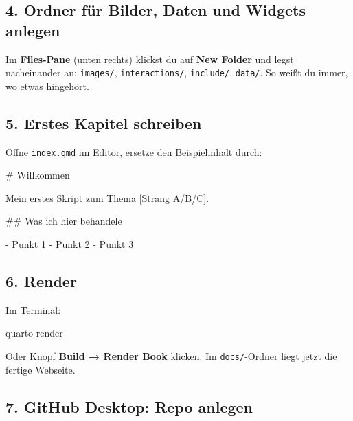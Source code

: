 \documentclass[
  ngerman,
  a4paper,
  DIV=11]{scrreprt}
\newenvironment{Shaded}{\begin{snugshade}}{\end{snugshade}}
\newcommand{\CommentTok}[1]{\textcolor[rgb]{0.37,0.37,0.37}{#1}}
\newcommand{\ExtensionTok}[1]{\textcolor[rgb]{0.00,0.23,0.31}{#1}}
\newcommand{\FunctionTok}[1]{\textcolor[rgb]{0.28,0.35,0.67}{#1}}
\newcommand{\NormalTok}[1]{\textcolor[rgb]{0.00,0.23,0.31}{#1}}
\newcommand{\OtherTok}[1]{\textcolor[rgb]{0.00,0.23,0.31}{#1}}
\newcommand{\SpecialStringTok}[1]{\textcolor[rgb]{0.13,0.47,0.30}{#1}}
\begin{document}
\subsection{4. Ordner für Bilder, Daten und Widgets
anlegen}\label{ordner-fuxfcr-bilder-daten-und-widgets-anlegen}

Im \textbf{Files-Pane} (unten rechts) klickst du auf \textbf{New Folder}
und legst nacheinander an: \texttt{images/}, \texttt{interactions/},
\texttt{include/}, \texttt{data/}. So weißt du immer, wo etwas
hingehört.

\subsection{5. Erstes Kapitel schreiben}\label{erstes-kapitel-schreiben}

Öffne \texttt{index.qmd} im Editor, ersetze den Beispielinhalt durch:

\begin{Shaded}
\begin{Highlighting}[]
\FunctionTok{\# Willkommen}

\NormalTok{Mein erstes Skript zum Thema }\CommentTok{[}\OtherTok{Strang A/B/C}\CommentTok{]}\NormalTok{.}

\FunctionTok{\#\# Was ich hier behandele}

\SpecialStringTok{{-} }\NormalTok{Punkt 1}
\SpecialStringTok{{-} }\NormalTok{Punkt 2}
\SpecialStringTok{{-} }\NormalTok{Punkt 3}
\end{Highlighting}
\end{Shaded}

\subsection{6. Render}\label{render}

Im Terminal:

\begin{Shaded}
\begin{Highlighting}[]
\ExtensionTok{quarto}\NormalTok{ render}
\end{Highlighting}
\end{Shaded}

Oder Knopf \textbf{Build → Render Book} klicken. Im
\texttt{docs/}-Ordner liegt jetzt die fertige Webseite.

\subsection{7. GitHub Desktop: Repo
anlegen}\label{github-desktop-repo-anlegen}
\end{document}
